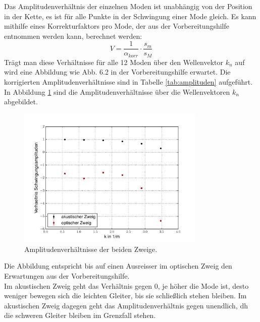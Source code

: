 Das Amplitudenverhältnis der einzelnen Moden ist unabhängig von der Position in der Kette, es ist für alle Punkte in der Schwingung einer Mode gleich.
Es kann mithilfe eines Korrekturfaktors pro Mode, der aus der Vorbereitungshilfe entnommen werden kann, berechnet werden:
\begin{equation}
	V = \frac{1}{\alpha_{korr}}\cdot\frac{s_m}{s_M}
\end{equation}
Trägt man diese Verhältnisse für alle 12 Moden über den Wellenvektor $k_n$ auf wird eine Abbildung wie Abb. 6.2 in der Vorbereitungshilfe erwartet.
Die korrigierten Amplitudenverhältnisse sind in Tabelle \ref{tab:amplituden} aufgeführt.
In Abbildung \ref{fig:amplituden} sind die Amplitudenverhältnisse über die Wellenvektoren $k_n$ abgebildet.
\begin{figure}[h]
	\centering\includegraphics[width=0.8\textwidth]{fig/amplituden}
	\caption{Amplitudenverhältnisse der beiden Zweige.}
	\label{fig:amplituden}
\end{figure}
Die Abbildung entspricht bis auf einen Ausreisser im optischen Zweig den Erwartungen aus der Vorbereitungshilfe.\\
Im akustischen Zweig geht das Verhältnis gegen 0, je höher die Mode ist, desto weniger bewegen sich die leichten Gleiter, bis sie schließlich stehen bleiben. Im akustischen Zweig dagegen geht das Amplitudenverhältnis gegen unendlich, dh die schweren Gleiter bleiben im Grenzfall stehen.